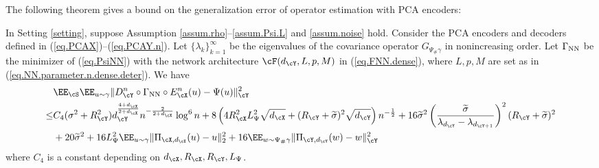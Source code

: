\documentclass[11pt]{article} %
\begin{document}

The following theorem gives a bound on the generalization error of operator estimation with PCA encoders:
\begin{theorem}\label{thm.pca}
	In Setting \ref{setting}, suppose Assumption \ref{assum.rho}--\ref{assum.Psi.L} and \ref{assum.noise} hold. Consider the PCA encoders and decoders defined in (\ref{eq.PCAX})--(\ref{eq.PCAY.n}). 
	Let $\{\lambda_k\}_{k=1}^{\infty}$ be the eigenvalues of the covariance operator $G_{\Psi_{\#}\gamma}$ in nonincreasing order.
	 Let $\Gamma_{\rm NN}$ be the minimizer of (\ref{eq.PsiNN}) with the network architecture $\cF(d_{\cY},L,p,M)$ in (\ref{eq.FNN.dense}), where $L,p,M$ are set as in (\ref{eq.NN.parameter.n.dense.deter}). We have
	\begin{align*}
		&\EE_{\cS}\EE_{u\sim \gamma}\|D_{\cY}^n\circ \Gamma_{\rm NN} \circ E_{\cX}^n(u)- \Psi(u)\|_{\cY}^2 \\
		\leq& C_{4}(\sigma^2+R_{\cY}^2)d_{\cY}^{\frac{4+d_{\cX}}{2+d_{\cX}}}n^{-\frac{2}{2+d_{\cX}}}\log^6 n +8\left(4R^2_{\cX}L_{\Psi}^2\sqrt{d_{\cX}}+(R_{\cY}+\widetilde{\sigma})^2\sqrt{d_{\cY}}\right)n^{-\frac{1}{2}} +16\widetilde{\sigma}^2\left(\frac{\widetilde{\sigma}}{\lambda_{d_{\cY}}-\lambda_{d_{\cY+1}}}\right)^2(R_{\cY} +\widetilde{\sigma})^2\nonumber\\ 
		&+ 20\widetilde{\sigma}^2 + 16L_{\Psi}^2\EE_{u\sim \gamma}\| \Pi_{\cX,d_{\cX}}(u)-u\|_{2}^2+16\EE_{w\sim \Psi_{\#}\gamma}\|\Pi_{\cY,d_{\cY}}(w)- w\|_{\cY}^2
	\end{align*}
where $C_{4}$ is a constant depending on $d_{\cX},R_{\cX}, R_{\cY},L_{\Psi}$.
\end{theorem}
\end{document}
